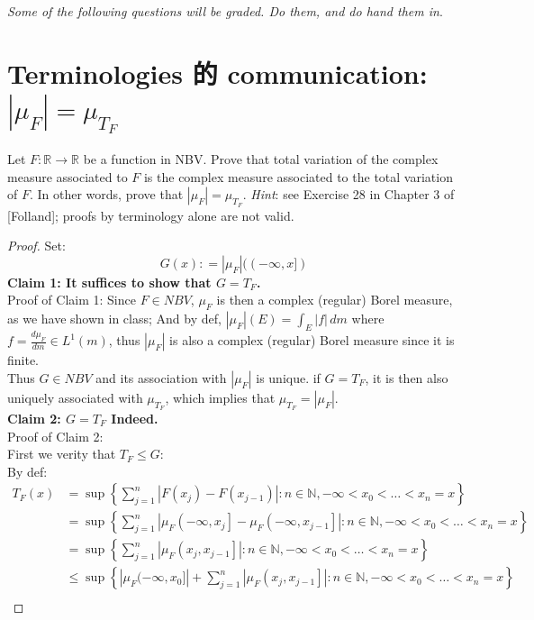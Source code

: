 \documentclass[lang=cn,11pt]{elegantbook}
\begin{document}
\vspace*{5mm}
\begin{center}
\textit{Some of the following questions will be graded. Do them, and do hand them in}.
\end{center}


\section{Terminologies 的 communication: $|\mu_F|=\mu_{T_F}$}
  Let $F\colon\mathbb{R}\to\mathbb{R}$ be a function in NBV. Prove that total variation of the complex measure associated to $F$ is the complex measure associated to the total variation of $F$. In other words, prove that $|\mu_F|=\mu_{T_F}$.
\textit{Hint}: see Exercise 28 in Chapter 3 of [Folland]; proofs by terminology alone are not valid.
\begin{proof}
Set: \[
G(x) : = |\mu_F| ((-\infty,x])
\]
\textbf{Claim 1: It suffices to show that $G = T_F$.}\\
Proof of Claim 1: Since $F \in NBV$, $\mu_F$ is then a complex (regular) Borel measure, as we have shown in class; And by def, 
  \(|\mu_F|(E) = \int_E |f| \, d m\) where $f = \frac{d\mu_F}{dm}\in L^1(m)$, thus $|\mu_F|$ is also a complex (regular) Borel measure since it is finite.\\
  Thus $G \in NBV$ and its association with $|\mu_F|$ is unique. if $G = T_F$, it is then also uniquely associated with $\mu_{T_F}$, which implies that $\mu_{T_F}=|\mu_F|$.\\
\textbf{Claim 2: $G = T_F$ Indeed.}\\
Proof of Claim 2:\\
First we verity that  $T_F\leq G$:\\
By def: 
$$
\begin{aligned}
T_F(x) & =\sup \left\{\sum_{j=1}^n\left|F\left(x_j\right)-F\left(x_{j-1}\right)\right|: n \in \mathbb{N},-\infty<x_0<\ldots<x_n=x\right\} \\
& =\sup \left\{\sum_{j=1}^n\left|\mu_F\left(-\infty, x_j\right]-\mu_F\left(-\infty, x_{j-1}\right]\right|: n \in \mathbb{N},-\infty<x_0<\ldots<x_n=x\right\} \\
& =\sup \left\{\sum_{j=1}^n\left|\mu_F\left(x_j, x_{j-1}\right]\right|: n \in \mathbb{N},-\infty<x_0<\ldots<x_n=x\right\}\\
& \leq \sup \left\{ |\mu_F (-\infty, x_0]| +   \sum_{j=1}^n\left|\mu_F\left(x_j, x_{j-1}\right]\right|: n \in \mathbb{N},-\infty<x_0<\ldots<x_n=x\right\}\\

\end{aligned}$$
\end{proof}
\end{document}
